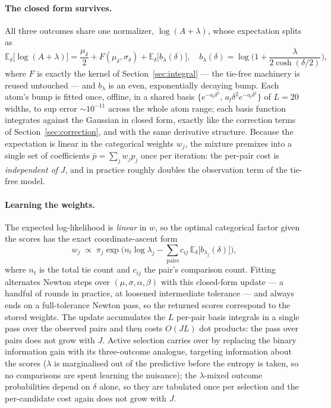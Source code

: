 \documentclass[12pt]{article}
\begin{document}
\paragraph{The closed form survives.}
All three outcomes share one normalizer, $\log(A + \lambda)$, whose expectation splits as
\begin{equation*}
    \mathbb{E}_{\delta}\big[\log(A + \lambda)\big]
    = \frac{\mu_\delta}{2} + F(\mu_\delta, \sigma_\delta) + \mathbb{E}_{\delta}\big[b_\lambda(\delta)\big],
    \quad
    b_\lambda(\delta) = \log\!\Big(1 + \frac{\lambda}{2\cosh(\delta/2)}\Big),
\end{equation*}
where $F$ is exactly the kernel of Section~\ref{sec:integral} --- the tie-free machinery is reused
untouched --- and $b_\lambda$ is an even, exponentially decaying bump. Each atom's bump is fitted
once, offline, in a shared basis $\{e^{-a_l\delta^2},\, a_l\delta^2 e^{-a_l\delta^2}\}$ of $L=20$
widths, to sup error $\sim 10^{-11}$ across the whole atom range; each basis function integrates
against the Gaussian in closed form, exactly like the correction terms of
Section~\ref{sec:correction}, and with the same derivative structure. Because the expectation is
linear in the categorical weights $w_j$, the mixture premixes into a single set of coefficients
$\bar p = \sum_j w_j p_j$ once per iteration: the per-pair cost is \emph{independent of} $J$, and
in practice roughly doubles the observation term of the tie-free model.

\paragraph{Learning the weights.}
The expected log-likelihood is \emph{linear} in $w$, so the optimal categorical factor given the
scores has the exact coordinate-ascent form
\begin{equation*}
    w_j \;\propto\; \pi_j \exp\Big( n_t \log\lambda_j
      - \sum_{\text{pairs}} c_{ij}\, \mathbb{E}_{\delta}\big[b_{\lambda_j}(\delta)\big] \Big),
\end{equation*}
where $n_t$ is the total tie count and $c_{ij}$ the pair's comparison count. Fitting alternates
Newton steps over $(\mu, \sigma, \alpha, \beta)$ with this closed-form update --- a handful of
rounds in practice, at loosened intermediate tolerance --- and always ends on a full-tolerance
Newton pass, so the returned scores correspond to the stored weights. The
update accumulates the $L$ per-pair basis integrals in a single pass over the
observed pairs and then costs $O(JL)$ dot products: the pass over pairs does not grow with $J$.
Active selection carries over by replacing the binary information gain with its three-outcome
analogue, targeting information about the scores ($\lambda$ is marginalised out of the predictive
before the entropy is taken, so no comparisons are spent learning the nuisance); the
$\lambda$-mixed outcome probabilities depend on $\delta$ alone, so they are tabulated once per
selection and the per-candidate cost again does not grow with $J$.
\end{document}
